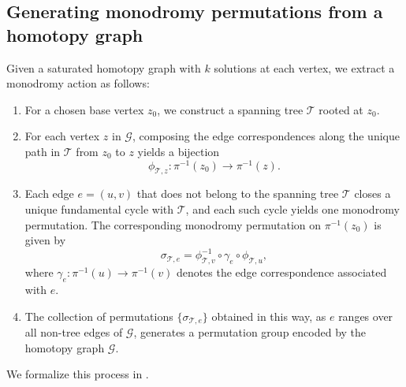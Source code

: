 \documentclass[11pt]{amsart}
\theoremstyle{definition}
\theoremstyle{remark}
\begin{document}
\subsection{Generating monodromy permutations from a homotopy graph}

Given a saturated homotopy graph with $k$ solutions at each vertex, we extract a monodromy action as follows: 
\begin{enumerate}
    \item For a chosen base vertex $z_0$, we construct a spanning tree $\mathcal{T}$ rooted at $z_0$.
    \item For each vertex $z$ in $\mathcal{G}$, composing the edge correspondences along the unique path in $\mathcal{T}$ from $z_0$ to $z$ yields a bijection 
\[
\phi_{\mathcal{T},z} : \pi^{-1}(z_0) \to \pi^{-1}(z).
\]
\item Each edge $e = (u,v)$ that does not belong to the spanning tree $\mathcal{T}$ closes a
unique fundamental cycle with $\mathcal{T}$, and each such cycle yields one monodromy permutation. The corresponding monodromy permutation on $\pi^{-1}(z_0)$ is
given by
\begin{equation}\label{eq:tree-permutations}
\sigma_{\mathcal{T}, e} = \phi_{\mathcal{T},v}^{-1} \circ \gamma_e \circ \phi_{\mathcal{T},u},
\end{equation}
where $\gamma_e : \pi^{-1}(u) \to \pi^{-1}(v)$ denotes the edge
correspondence associated with $e$.
\item The collection of permutations $\{\sigma_{\mathcal{T},e}\}$ obtained in this way, as $e$ ranges over all non-tree edges of $\mathcal{G}$, generates a permutation group encoded by the homotopy graph $\mathcal{G}.$
\end{enumerate}

We formalize this process in .
\end{document}
